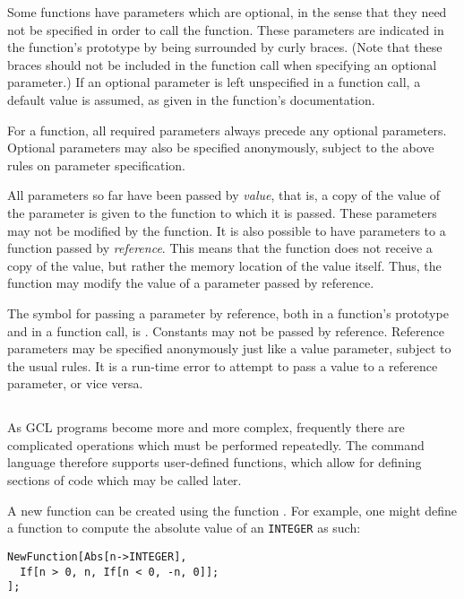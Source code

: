 Some functions have parameters which are optional, in the sense that
they need not be specified in order to call the function.  These
parameters are indicated in the function's prototype by being
surrounded by curly braces.  (Note that these braces should not be
included in the function call when specifying an optional parameter.)
If an optional parameter is left unspecified in a function call, a
default value is assumed, as given in the function's documentation.

For a function, all required parameters always precede any optional
parameters.  Optional parameters may also be specified anonymously,
subject to the above rules on parameter specification.

All parameters so far have been passed by {\it value}, that is, a copy
of the value of the parameter is given to the function to which it is
passed.  These parameters may not be modified by the function.  It is
also possible to have parameters to a function passed by {\it
reference}.  This means that the function does not receive a copy of
the value, but rather the memory location of the value itself.  Thus,
the function may modify the value of a parameter passed by reference.

The symbol for passing a parameter by reference, both in a function's
prototype and in a function call, is {\tt <->}.  Constants may not be
passed by reference.  Reference parameters may be specified
anonymously just like a value parameter, subject to the usual rules.
It is a run-time error to attempt to pass a value to a reference
parameter, or vice versa.

\subsection{}

As GCL programs become more and more complex, frequently there are
complicated operations which must be performed repeatedly.  The
command language therefore supports user-defined functions, which
allow for defining sections of code which may be called later.

A new function can be created using the function .
For example, one might define a function to compute the absolute value
of an {\tt INTEGER} as such:

\begin{verbatim}
NewFunction[Abs[n->INTEGER],
  If[n > 0, n, If[n < 0, -n, 0]];
];
\end{verbatim}

